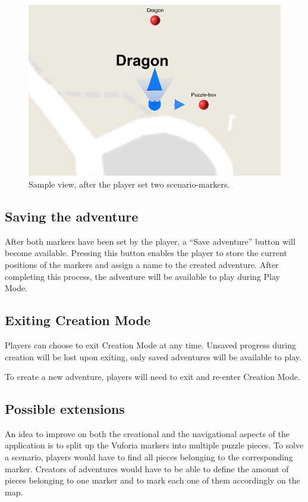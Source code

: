 \documentclass{sigchi-ext}
\begin{document}
\begin{figure}
	\includegraphics[width=1\columnwidth]{figures/CM_Markers}
	\caption{Sample view, after the player set two scenario-markers.}\label{fig:CM_Markers}
\end{figure}

\subsection{Saving the adventure}

After both markers have been set by the player, a ``Save adventure'' button will become available. Pressing this button enables the player to store the current positions of the markers and assign a name to the created adventure. After completing this process, the adventure will be available to play during Play Mode.

\subsection{Exiting Creation Mode}

Players can choose to exit Creation Mode at any time. Unsaved progress during creation will be lost upon exiting, only saved adventures will be available to play.

To create a new adventure, players will need to exit and re-enter Creation Mode.


\subsection{Possible extensions}

An idea to improve on both the creational and the navigational aspects of the application is to split up the Vuforia markers into multiple puzzle pieces. To solve a scenario, players would have to find all pieces belonging to the corresponding marker. Creators of adventures would have to be able to define the amount of pieces belonging to one marker and to mark each one of them accordingly on the map.
\end{document}
